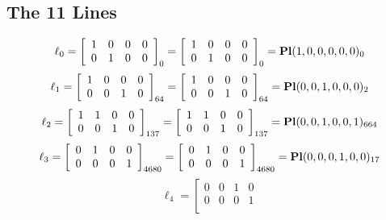 \documentclass{article}
\begin{document}
{\subsection*{The 11 Lines}
$$
\ell_{0} = 
\left[
\begin{array}{*{4}{r}}
1 & 0 & 0 & 0\\
0 & 1 & 0 & 0\\
\end{array}
\right]
_{0}
=
\left[
\begin{array}{*{4}c}
1  & 0  & 0  & 0\\
0  & 1  & 0  & 0\\
\end{array}
\right]_{0}
={\rm\bf Pl}(1,0,0,0,0,0 )_{0}$$
$$
\ell_{1} = 
\left[
\begin{array}{*{4}{r}}
1 & 0 & 0 & 0\\
0 & 0 & 1 & 0\\
\end{array}
\right]
_{64}
=
\left[
\begin{array}{*{4}c}
1  & 0  & 0  & 0\\
0  & 0  & 1  & 0\\
\end{array}
\right]_{64}
={\rm\bf Pl}(0,0,1,0,0,0 )_{2}$$
$$
\ell_{2} = 
\left[
\begin{array}{*{4}{r}}
1 & 1 & 0 & 0\\
0 & 0 & 1 & 0\\
\end{array}
\right]
_{137}
=
\left[
\begin{array}{*{4}c}
1  & 1  & 0  & 0\\
0  & 0  & 1  & 0\\
\end{array}
\right]_{137}
={\rm\bf Pl}(0,0,1,0,0,1 )_{664}$$
$$
\ell_{3} = 
\left[
\begin{array}{*{4}{r}}
0 & 1 & 0 & 0\\
0 & 0 & 0 & 1\\
\end{array}
\right]
_{4680}
=
\left[
\begin{array}{*{4}c}
0  & 1  & 0  & 0\\
0  & 0  & 0  & 1\\
\end{array}
\right]_{4680}
={\rm\bf Pl}(0,0,0,1,0,0 )_{17}$$
$$
\ell_{4} = 
\left[
\begin{array}{*{4}{r}}
0 & 0 & 1 & 0\\
0 & 0 & 0 & 1\\
\end{array}
$$}
\end{document}
